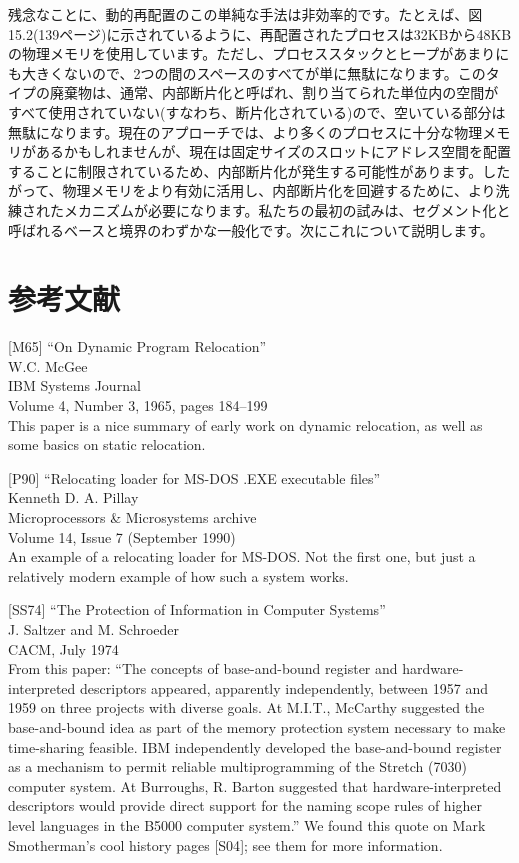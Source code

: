 残念なことに、動的再配置のこの単純な手法は非効率的です。たとえば、図15.2(139ページ)に示されているように、再配置されたプロセスは32KBから48KBの物理メモリを使用しています。ただし、プロセススタックとヒープがあまりにも大きくないので、2つの間のスペースのすべてが単に無駄になります。このタイプの廃棄物は、通常、内部断片化と呼ばれ、割り当てられた単位内の空間がすべて使用されていない(すなわち、断片化されている)ので、空いている部分は無駄になります。現在のアプローチでは、より多くのプロセスに十分な物理メモリがあるかもしれませんが、現在は固定サイズのスロットにアドレス空間を配置することに制限されているため、内部断片化が発生する可能性があります。したがって、物理メモリをより有効に活用し、内部断片化を回避するために、より洗練されたメカニズムが必要になります。私たちの最初の試みは、セグメント化と呼ばれるベースと境界のわずかな一般化です。次にこれについて説明します。

\hypertarget{ux53c2ux8003ux6587ux732e-7}{%
\section*{参考文献}\label{ux53c2ux8003ux6587ux732e-7}}

{[}M65{]} ``On Dynamic Program Relocation''\\
W.C. McGee\\
IBM Systems Journal\\
Volume 4, Number 3, 1965, pages 184--199\\
This paper is a nice summary of early work on dynamic relocation, as
well as some basics on static relocation.

{[}P90{]} ``Relocating loader for MS-DOS .EXE executable files''\\
Kenneth D. A. Pillay\\
Microprocessors \& Microsystems archive\\
Volume 14, Issue 7 (September 1990)\\
An example of a relocating loader for MS-DOS. Not the first one, but
just a relatively modern example of how such a system works.

{[}SS74{]} ``The Protection of Information in Computer Systems''\\
J. Saltzer and M. Schroeder\\
CACM, July 1974\\
From this paper: ``The concepts of base-and-bound register and
hardware-interpreted descriptors appeared, apparently independently,
between 1957 and 1959 on three projects with diverse goals. At M.I.T.,
McCarthy suggested the base-and-bound idea as part of the memory
protection system necessary to make time-sharing feasible. IBM
independently developed the base-and-bound register as a mechanism to
permit reliable multiprogramming of the Stretch (7030) computer system.
At Burroughs, R. Barton suggested that hardware-interpreted descriptors
would provide direct support for the naming scope rules of higher level
languages in the B5000 computer system.'' We found this quote on Mark
Smotherman's cool history pages {[}S04{]}; see them for more
information.


